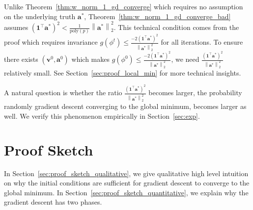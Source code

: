 \documentclass{article}
\newcommand{\poly}{\mathrm{poly}}
\newcommand{\firstlayerWN}{v}
\newcommand{\secondlayer}{a}
\newcommand{\vect}[1]{\mathbf{#1}}
\newcommand{\norm}[1]{\left\|#1\right\|}
\begin{document}
Unlike Theorem~\ref{thm:w_norm_1_gd_converge} which requires no assumption on the underlying truth $\vect{\secondlayer}^*$, Theorem~\ref{thm:w_norm_1_gd_converge_bad} assumes  $\left(\vect{1}^\top \vect{\secondlayer}^*\right)^2 < \frac{1}{\poly(p)}\norm{\vect{\secondlayer}^*}_2^2$.
This technical condition comes from the proof which requires invariance $g(\phi^t) \le \frac{-2\left(\vect{1}^\top \vect{\secondlayer}^*\right)^2}{\norm{\vect{\secondlayer}^*}_2^2}$ for all iterations.
To ensure there exists $\left(\vect{\firstlayerWN}^0,\vect{\secondlayer}^0\right)$
which makes $g(\phi^0) \le \frac{-2\left(\vect{1}^\top \vect{\secondlayer}^*\right)^2}{\norm{\vect{\secondlayer}^*}_2^2}$, we need $\frac{\left(\vect{1}^\top \vect{\secondlayer}^*\right)^2}{\norm{\vect{\secondlayer}^*}_2^2}$ relatively small.
See Section~\ref{sec:proof_local_min} for more technical insights.

A natural question is whether the ratio $\frac{\left(\vect{1}^\top \vect{\secondlayer}^*\right)^2}{\norm{\vect{\secondlayer}^*}_2^2}$ becomes larger, the probability randomly gradient descent converging to the global minimum, becomes larger as well.
We verify this phenomenon empirically in Section~\ref{sec:exp}.




\section{Proof Sketch}
\label{sec:proof_sketch}
In Section~\ref{sec:proof_sketch_qualitative}, we give qualitative high level intuition on why the initial conditions are sufficient for gradient descent to converge to the global minimum.
In Section~\ref{sec:proof_sketch_quantitative}, we explain why the gradient descent has two phases.
\end{document}
